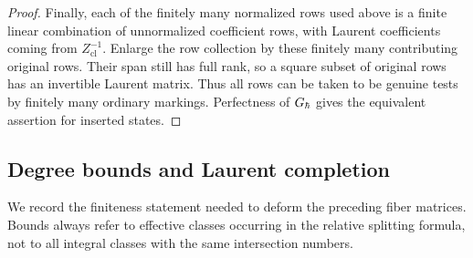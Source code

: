 \begin{proof}
Finally, each of the finitely many normalized rows used above is a
finite linear combination of unnormalized coefficient rows, with
Laurent coefficients coming from $Z_{\mathrm{cl}}^{-1}$.  Enlarge the
row collection by these finitely many contributing original rows.
Their span still has full rank, so a square subset of original rows
has an invertible Laurent matrix.  Thus all rows can be taken to be
genuine tests by finitely many ordinary markings.  Perfectness of
$G_{\hbar}$ gives the equivalent assertion for inserted states.
\end{proof}

\subsection{Degree bounds and Laurent completion}

We record the finiteness statement needed to deform the preceding
fiber matrices.  Bounds always refer to effective classes occurring
in the relative splitting formula, not to all integral classes with
the same intersection numbers.

